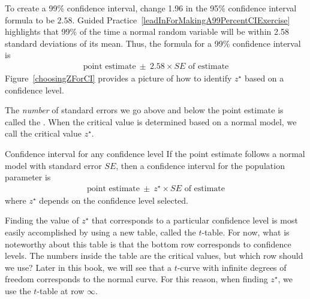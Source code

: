To create a 99\% confidence interval, change 1.96 in the 95\% confidence interval formula to be $2.58$. Guided Practice~\ref{leadInForMakingA99PercentCIExercise} highlights that 99\% of the time a normal random variable will be within 2.58 standard deviations of its mean. Thus, the formula for a 99\% confidence interval is
\begin{eqnarray}
\text{point estimate}\ \pm\ 2.58\times SE \text{ of estimate}
\label{99PercCIForMean}
\label{99PercCIForNormalPointEstimate}
\end{eqnarray}
Figure~\ref{choosingZForCI} provides a picture of how to identify $z^{\star}$ based on a confidence level. 

The \emph{number} of standard errors we go above and below the point estimate is called the .  When the critical value is determined based on a normal model, we call the critical value $z^{\star}$. 

\begin{onebox}{Confidence interval for any confidence level}
If the point estimate follows a normal model with standard error $SE$, then a confidence interval for the population parameter is
\begin{eqnarray*}
\text{point estimate}\ \pm\ z^{\star} \times SE \text{ of estimate}
\end{eqnarray*}
where $z^{\star}$ depends on the confidence level selected.\end{onebox}

Finding the value of $z^{\star}$ that corresponds to a particular confidence level is most easily accomplished by using a new table, called the $t$-table. For now, what is noteworthy about this table is that the bottom row corresponds to confidence levels. The numbers inside the table are the critical values, but which row should we use? Later in this book, we will see that a $t$-curve with infinite degrees of freedom corresponds to the normal curve. For this reason, when finding $z^{\star}$, we use the $t$-table at row $\infty$.

